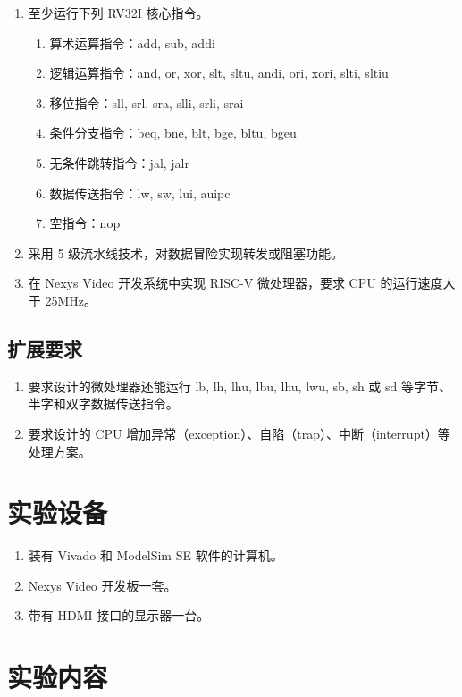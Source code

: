 \documentclass[12pt,hyperref,a4paper,UTF8]{ctexart}
\begin{document}
\begin{enumerate}
    \item 至少运行下列 RV32I 核心指令。
    \begin{enumerate}
        \item 算术运算指令：add, sub, addi
        \item 逻辑运算指令：and, or, xor, slt, sltu, andi, ori, xori, slti, sltiu
        \item 移位指令：sll, srl, sra, slli, srli, srai
        \item 条件分支指令：beq, bne, blt, bge, bltu, bgeu
        \item 无条件跳转指令：jal, jalr
        \item 数据传送指令：lw, sw, lui, auipc
        \item 空指令：nop
    \end{enumerate}
    \item 采用 5 级流水线技术，对数据冒险实现转发或阻塞功能。
    \item 在 Nexys Video 开发系统中实现 RISC-V 微处理器，要求 CPU 的运行速度大于 25MHz。
\end{enumerate}

\subsection*{扩展要求}

\begin{enumerate}
    \item 要求设计的微处理器还能运行 lb, lh, lhu, lbu, lhu, lwu, sb, sh 或 sd 等字节、半字和双字数据传送指令。
    \item 要求设计的 CPU 增加异常（exception）、自陷（trap）、中断（interrupt）等处理方案。
\end{enumerate}


\section{实验设备}

\begin{enumerate}
    \item 装有 Vivado 和 ModelSim SE 软件的计算机。
    \item Nexys Video 开发板一套。
    \item 带有 HDMI 接口的显示器一台。
\end{enumerate}

\section{实验内容}
\end{document}
